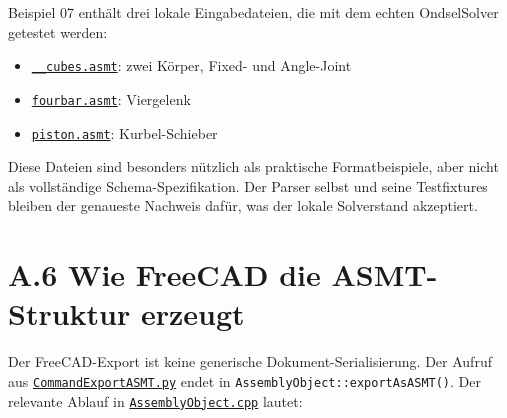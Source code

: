 \documentclass[
  12pt
]{book}
\providecommand{\tightlist}{%
  \setlength{\itemsep}{0pt}\setlength{\parskip}{0pt}}
\begin{document}
Beispiel 07 enthält drei lokale Eingabedateien, die mit dem echten
OndselSolver getestet werden:

\begin{itemize}
\tightlist
\item
  \href{./examples/07-ondselsolver-real-asmt/__cubes.asmt}{\texttt{\_\_cubes.asmt}}:
  zwei Körper, Fixed- und Angle-Joint
\item
  \href{./examples/07-ondselsolver-real-asmt/fourbar.asmt}{\texttt{fourbar.asmt}}:
  Viergelenk
\item
  \href{./examples/07-ondselsolver-real-asmt/piston.asmt}{\texttt{piston.asmt}}:
  Kurbel-Schieber
\end{itemize}

Diese Dateien sind besonders nützlich als praktische Formatbeispiele,
aber nicht als vollständige Schema-Spezifikation. Der Parser selbst und
seine Testfixtures bleiben der genaueste Nachweis dafür, was der lokale
Solverstand akzeptiert.

\hypertarget{wie-freecad-die-asmt-struktur-erzeugt}{%
\section{\texorpdfstring{{A.6} Wie FreeCAD die ASMT-Struktur
erzeugt}{A.6 Wie FreeCAD die ASMT-Struktur erzeugt}}\label{wie-freecad-die-asmt-struktur-erzeugt}}

Der FreeCAD-Export ist keine generische Dokument-Serialisierung. Der
Aufruf aus
\href{https://github.com/FreeCAD/FreeCAD/blob/main/src/Mod/Assembly/CommandExportASMT.py}{\texttt{CommandExportASMT.py}}
endet in \texttt{AssemblyObject::exportAsASMT()}. Der relevante Ablauf
in
\href{https://github.com/FreeCAD/FreeCAD/blob/main/src/Mod/Assembly/App/AssemblyObject.cpp}{\texttt{AssemblyObject.cpp}}
lautet:
\end{document}
